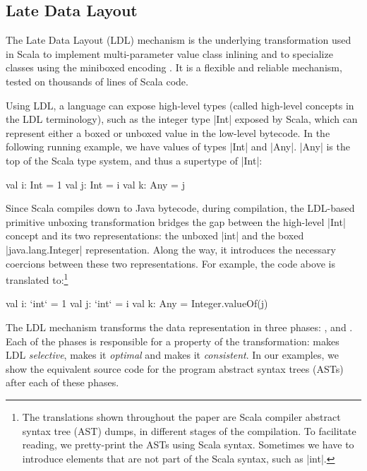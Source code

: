 \subsection{Late Data Layout}

The Late Data Layout (LDL) mechanism \cite{ldl} is the underlying transformation used in Scala to implement multi-parameter value class inlining and to specialize classes using the miniboxed encoding \cite{miniboxing}. It is a flexible and reliable mechanism, tested on thousands of lines of Scala code.

Using LDL, a language can expose high-level types (called high-level concepts in the LDL terminology), such as the integer type |Int| exposed by Scala, which can represent either a boxed or unboxed value in the low-level bytecode. In the following running example, we have values of types |Int| and |Any|. |Any| is the top of the Scala type system, and thus a supertype of |Int|:

\begin{lstlisting-nobreak}
val i: Int = 1
val j: Int = i
val k: Any = j
\end{lstlisting-nobreak}

Since Scala compiles down to Java bytecode, during compilation, the LDL-based primitive unboxing transformation bridges the gap between the high-level |Int| concept and its two representations: the unboxed |int| and the boxed |java.lang.Integer| representation. Along the way, it introduces the necessary coercions between these two representations. For example, the code above is translated to:\footnote{The translations shown throughout the paper are Scala compiler abstract syntax tree (AST) dumps, in different stages of the compilation. To facilitate reading, we pretty-print the ASTs using Scala syntax. Sometimes we have to introduce elements that are not part of the Scala syntax, such as |int|.}

\begin{lstlisting-nobreak}
val i: `int` = 1
val j: `int` = i
val k: Any = Integer.valueOf(j)
\end{lstlisting-nobreak}

The LDL mechanism transforms the data representation in three phases:
\inject{}, \coerce{} and \commit{}. Each of the phases is responsible
for a property of the transformation: \inject{} makes LDL
\emph{selective}, \coerce{} makes it \emph{optimal} and \commit{}
makes it \emph{consistent}. In our examples, we show the equivalent
source code for the program abstract syntax trees (ASTs) after each of
these phases.

